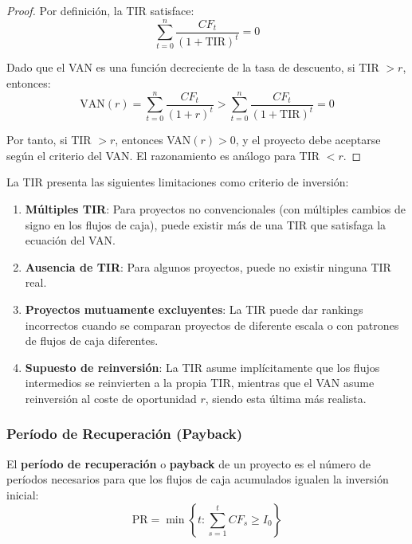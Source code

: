 \begin{proof}
Por definición, la TIR satisface:
$$\sum_{t=0}^{n} \frac{CF_t}{(1+\text{TIR})^t} = 0$$

Dado que el VAN es una función decreciente de la tasa de descuento, si TIR $> r$, entonces:
$$\text{VAN}(r) = \sum_{t=0}^{n} \frac{CF_t}{(1+r)^t} > \sum_{t=0}^{n} \frac{CF_t}{(1+\text{TIR})^t} = 0$$

Por tanto, si TIR $> r$, entonces VAN$(r) > 0$, y el proyecto debe aceptarse según el criterio del VAN. El razonamiento es análogo para TIR $< r$.
\end{proof}

\begin{proposicion}
La TIR presenta las siguientes limitaciones como criterio de inversión:

\begin{enumerate}
\item \textbf{Múltiples TIR}: Para proyectos no convencionales (con múltiples cambios de signo en los flujos de caja), puede existir más de una TIR que satisfaga la ecuación del VAN.

\item \textbf{Ausencia de TIR}: Para algunos proyectos, puede no existir ninguna TIR real.

\item \textbf{Proyectos mutuamente excluyentes}: La TIR puede dar rankings incorrectos cuando se comparan proyectos de diferente escala o con patrones de flujos de caja diferentes.

\item \textbf{Supuesto de reinversión}: La TIR asume implícitamente que los flujos intermedios se reinvierten a la propia TIR, mientras que el VAN asume reinversión al coste de oportunidad $r$, siendo esta última más realista.
\end{enumerate}
\end{proposicion}

\begin{center}
    
\end{center}

\subsubsection{Período de Recuperación (Payback)}

\begin{definicion}
El \textbf{período de recuperación} o \textbf{payback} de un proyecto es el número de períodos necesarios para que los flujos de caja acumulados igualen la inversión inicial:
\begin{equation}
\text{PR} = \min\left\{t : \sum_{s=1}^{t} CF_s \geq I_0\right\}
\end{equation}
\end{definicion}

